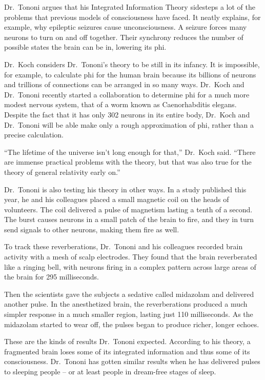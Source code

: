 ﻿\documentclass[12pt]{article}
\begin{document}
Dr.~Tononi argues that his Integrated Information Theory sidesteps a lot of the problems that
previous models of consciousness have faced. It neatly explains, for example, why epileptic seizures
cause unconsciousness. A seizure forces many neurons to turn on and off together. Their synchrony
reduces the number of possible states the brain can be in, lowering its phi.

Dr.~Koch considers Dr.~Tononi's theory to be still in its infancy. It is impossible, for example, to
calculate phi for the human brain because its billions of neurons and trillions of connections can
be arranged in so many ways. Dr.~Koch and Dr.~Tononi recently started a collaboration to determine
phi for a much more modest nervous system, that of a worm known as Caenorhabditis elegans. Despite
the fact that it has only 302 neurons in its entire body, Dr.~Koch and Dr.~Tononi will be able make
only a rough approximation of phi, rather than a precise calculation.

``The lifetime of the universe isn't long enough for that,'' Dr.~Koch said. ``There are immense
practical problems with the theory, but that was also true for the theory of general relativity
early on.''

Dr.~Tononi is also testing his theory in other ways. In a study published this year, he and his
colleagues placed a small magnetic coil on the heads of volunteers. The coil delivered a pulse of
magnetism lasting a tenth of a second. The burst causes neurons in a small patch of the brain to
fire, and they in turn send signals to other neurons, making them fire as well.

To track these reverberations, Dr.~Tononi and his colleagues recorded brain activity with a mesh of
scalp electrodes. They found that the brain reverberated like a ringing bell, with neurons firing in
a complex pattern across large areas of the brain for 295 milliseconds.

Then the scientists gave the subjects a sedative called midazolam and delivered another pulse. In
the anesthetized brain, the reverberations produced a much simpler response in a much smaller
region, lasting just 110 milliseconds. As the midazolam started to wear off, the pulses began to
produce richer, longer echoes.

These are the kinds of results Dr.~Tononi expected. According to his theory, a fragmented brain
loses some of its integrated information and thus some of its consciousness. Dr.~Tononi has gotten
similar results when he has delivered pulses to sleeping people -- or at least people in dream-free
stages of sleep.
\end{document}
